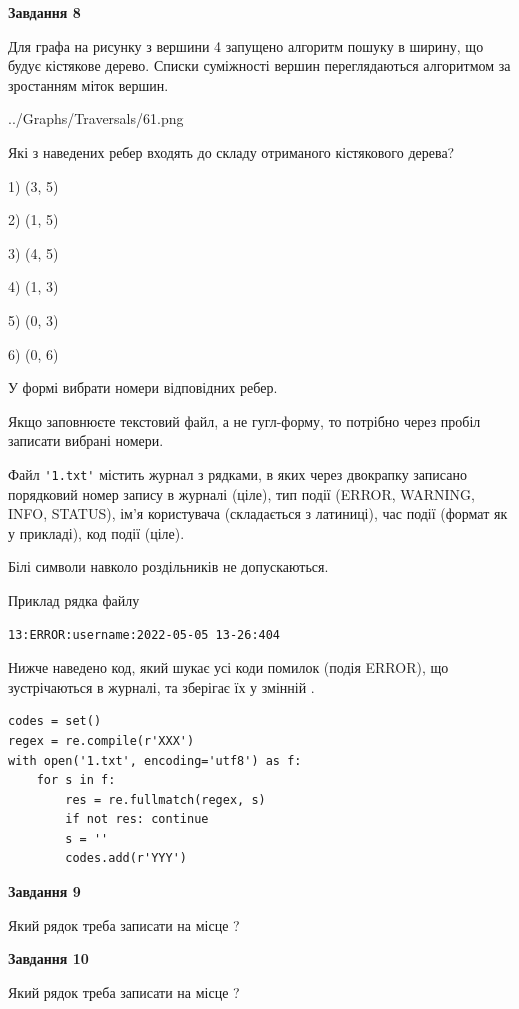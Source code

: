 \documentclass[12pt, ukrainian]{article}
\def\code#1{\Verb!#1!}
\begin{document}
{\begin {large}
{\begin {center}\textbf{Завдання 8}\end {center}}\par
Для графа на рисунку з вершини 4 запущено алгоритм пошуку в ширину, що будує кістякове дерево. Списки суміжності вершин переглядаються алгоритмом за зростанням міток вершин.\par
\begin{center}
	{../Graphs/Traversals/61.png}
\end{center}
\par Які з наведених ребер входять до складу отриманого кістякового дерева?\par
1) (3, 5)\par
2) (1, 5)\par
3) (4, 5)\par
4) (1, 3)\par
5) (0, 3)\par
6) (0, 6)\par
{\vskip 15pt} У формі вибрати номери відповідних ребер.


Якщо заповнюєте текстовий файл, а не гугл-форму, то потрібно через пробіл записа\-ти вибрані номери.\par
\newpage


Файл \code{'1.txt'} містить журнал з рядками, в яких через двокрапку записано поряд\-ко\-вий номер запису в журналі (ціле), тип події (ERROR, WARNING, INFO, STATUS), ім'я користувача (складається з латиниці), час події (фор\-мат як у прикладі), код події (ціле).

Білі символи навколо роздільників не допускаються.

Приклад рядка файлу



\begin{verbatim}
13:ERROR:username:2022-05-05 13-26:404
\end{verbatim}


Нижче наведено код, який шукає усі коди помилок (подія ERROR), що зустріча\-ють\-ся в журналі, та зберігає їх у змінній .



\begin{verbatim}
codes = set()
regex = re.compile(r'XXX')
with open('1.txt', encoding='utf8') as f:
    for s in f:
        res = re.fullmatch(regex, s)
        if not res: continue
        s = ''
        codes.add(r'YYY')
\end{verbatim}


{\begin {center}\textbf{Завдання 9}\end {center}}\par
Який рядок треба записати на місце  ?\par
\vspace{5mm}


{\begin {center}\textbf{Завдання 10}\end {center}}\par
Який рядок треба записати на місце  ?\par


\newpage


\end {large}}
\end{document}
